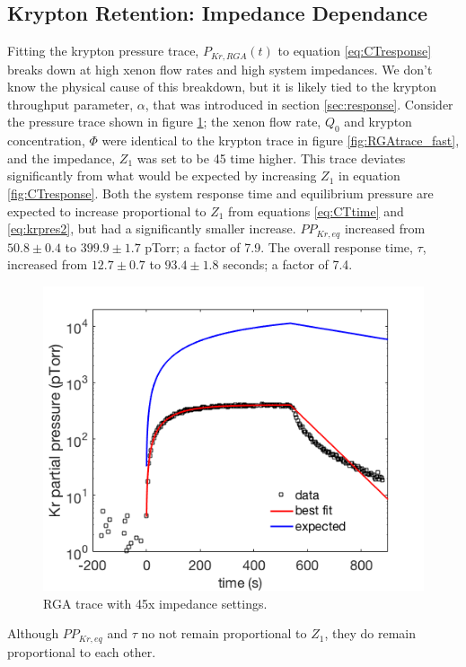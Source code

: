 \documentclass[12pt]{article}
\begin{document}
\subsection{Krypton Retention: Impedance Dependance}
Fitting the krypton pressure trace, $P_{Kr,RGA}(t)$ to equation \ref{eq:CTresponse} breaks down at high xenon flow rates and high system impedances. We don't know the physical cause of this breakdown, but it is likely tied to the krypton throughput parameter, $\alpha$, that was introduced in section \ref{sec:response}. Consider the pressure trace shown in figure \ref{fig:RGAtrace_slow}; the xenon flow rate, $Q_0$ and krypton concentration, $\Phi$ were identical to the krypton trace in figure \ref{fig:RGAtrace_fast}, and the impedance, $Z_1$ was set to be 45 time higher. This trace deviates significantly from what would be expected by increasing $Z_1$ in equation \ref{fig:CTresponse}. Both the system response time and equilibrium pressure are expected to increase proportional to $Z_1$ from equations \ref{eq:CTtime} and \ref{eq:krpres2}, but had a significantly smaller increase. $PP_{Kr,eq}$ increased from $50.8 \pm 0.4$ to $399.9\pm 1.7$ pTorr; a factor of 7.9. The overall response time, $\tau$, increased from $12.7 \pm 0.7$ to $93.4 \pm 1.8$ seconds; a factor of 7.4. 
\begin{figure}[h!]
\centering
\includegraphics[width=\textwidth]{Figures/RGAtrace_fit_slow_wexp.png}
\caption{RGA trace with 45x impedance settings. }
\label{fig:RGAtrace_slow}
\end{figure}

Although $PP_{Kr,eq}$ and $\tau$ no not remain proportional to $Z_1$, they do remain proportional to each other. 
\end{document}

